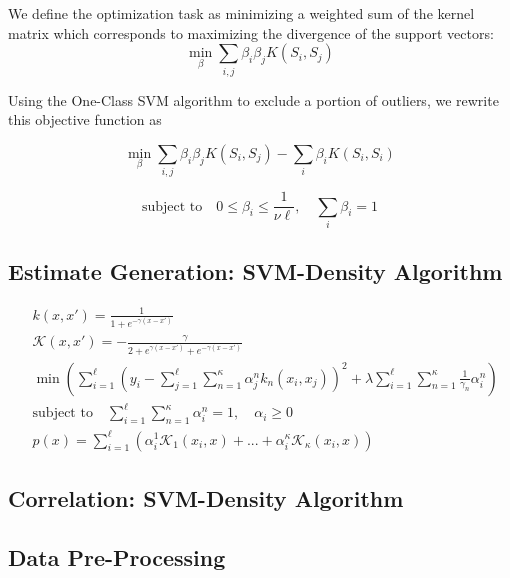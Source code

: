 \documentclass[10pt]{article}
\begin{document}
We define the optimization task as minimizing a weighted sum of the kernel matrix which corresponds to maximizing the divergence of the support vectors:
\[
\min_\beta \sum_{i,j} \beta_i \beta_j K(S_i,S_j)
\]

Using the One-Class SVM algorithm \cite{Scholkopf99} to exclude a portion of outliers, we rewrite this objective function as

\begin{equation}
\min_\beta \sum_{i,j} \beta_i \beta_j K(S_i,S_j) - \sum_i \beta_i K(S_i, S_i)
\end{equation}

\begin{equation}
\text{subject to} \quad 0 \le \beta_i \le \frac{1}{\nu \ell}, \quad \sum_i \beta_i = 1
\end{equation}

\subsection{Estimate Generation: SVM-Density Algorithm}
\begin{align}
&k(x,x') = \frac{1}{1+e^{-\gamma(x-x')} } \\
&\mathcal{K}(x,x') = -\frac{\gamma}{2 + e^{\gamma(x-x')} + e^{-\gamma(x-x')} } \\
&\min \left( \sum_{i=1}^\ell \left( y_i - \sum_{j=1}^\ell \sum_{n=1}^\kappa \alpha_j^n k_n(x_i, x_j) \right)^2 + \lambda \sum_{i=1}^\ell \sum_{n=1}^\kappa \frac{1}{\gamma_n} \alpha_i^n \right) \\
&\text{subject to} \quad \sum_{i=1}^\ell \sum_{n=1}^\kappa \alpha_i^n = 1, \quad \alpha_i \ge 0 \\
&p(x) = \sum_{i=1}^\ell \left( \alpha_i^1 \mathcal{K}_1(x_i,x) + ... + \alpha_i^\kappa \mathcal{K}_\kappa( x_i,x) \right)
\end{align}

\subsection{Correlation: SVM-Density Algorithm}

\subsection{Data Pre-Processing}

\end{document}
